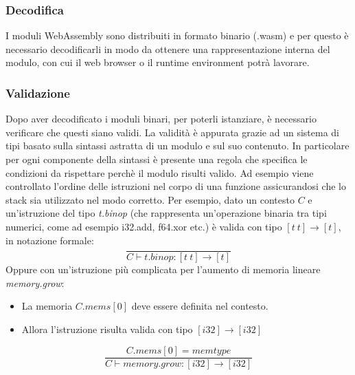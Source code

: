 \subsubsection{Decodifica}
I moduli WebAssembly sono distribuiti in formato binario (.wasm) e per questo è necessario decodificarli in modo da ottenere una rappresentazione interna del modulo, con cui il web browser o il runtime environment potrà lavorare.
\subsubsection{Validazione}
Dopo aver decodificato i moduli binari, per poterli istanziare, è necessario verificare che questi siano validi.
La validità è appurata grazie ad un sistema di tipi basato sulla sintassi astratta di un modulo e sul suo contenuto. In particolare per ogni componente della sintassi è presente una regola che specifica le condizioni da rispettare perchè il modulo risulti valido.
Ad esempio viene controllato l'ordine delle istruzioni nel corpo di una funzione assicurandosi che lo stack sia utilizzato nel modo corretto.
Per esempio, dato un contesto \(C\) e un'istruzione del tipo \emph{t.binop} (che rappresenta un'operazione binaria tra tipi numerici, come ad esempio i32.add, f64.xor etc.) è valida con tipo \([t~t]{\rightarrow} [t]\), in notazione formale: 
\begin{equation*}
\frac{
}{
        C {\vdash} t\mathsf{.}{\mathit{binop}} : [t~t] {\rightarrow} [t]
}
\end{equation*}
Oppure con un'istruzione più complicata per l'aumento di memoria lineare \emph{memory.grow}:
\begin{itemize}
        \item La memoria \(C.{\mathit{mems}}[0]\) deve essere definita nel contesto.
        \item Allora l'istruzione risulta valida con tipo \([{\mathit{i32}}] {\rightarrow} [{\mathit{i32}}]\)
\end{itemize}
\begin{equation*}
        \frac{
        C.{\mathit{mems}}[0] = {\mathit{memtype}}
      }{
        C {\vdash} {\mathit{memory.grow}} : [{\mathit{i32}}] {\rightarrow} [{\mathit{i32}}]
      }        
\end{equation*}
